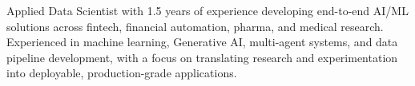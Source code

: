{\justifying\setlength{\parindent}{0pt}\noindent
Applied Data Scientist with 1.5 years of experience developing end-to-end AI/ML solutions across fintech, financial automation, pharma, and medical research. Experienced in machine learning, Generative AI, multi-agent systems, and data pipeline development, with a focus on translating research and experimentation into deployable, production-grade applications.\par}


